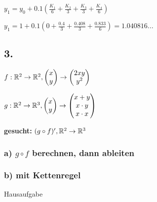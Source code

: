 $ y_1 = y_0 + 0.1 (\frac{K_1}{6} + \frac{K_2}{3} + \frac{K_3}{3} + \frac{K_4}{6}) $ 

$ y_1 = 1 + 0.1 (0 + \frac{0.4}{3} + \frac{0.408}{3} + \frac{0.833}{6}) = 1.040816 ... $ 

\subsection{3.}
$ f: \mathbb{R}^2 \rightarrow \mathbb{R}^2,  \begin{pmatrix} x\\y \end{pmatrix}  \rightarrow  \begin{pmatrix} 2xy\\y^2 \end{pmatrix} $

$ g: \mathbb{R}^2 \rightarrow \mathbb{R}^3,  \begin{pmatrix} x\\y \end{pmatrix}  \rightarrow  \begin{pmatrix} x+y\\x\cdot y\\x\cdot x \end{pmatrix} $

\textbf{gesucht:} $(g\circ f)', \mathbb{R}^2 \rightarrow \mathbb{R}^3$
\subsubsection{a) $g\circ f$ berechnen, dann ableiten}

\subsubsection{b) mit Kettenregel}

Hausaufgabe
